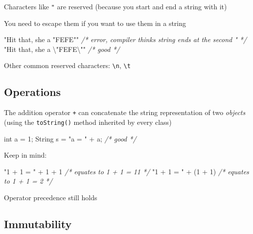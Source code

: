 \documentclass[]{article}
\newenvironment{Shaded}{}{}
\newcommand{\BuiltInTok}[1]{#1}
\newcommand{\CommentTok}[1]{\textcolor[rgb]{0.38,0.63,0.69}{\textit{#1}}}
\newcommand{\DataTypeTok}[1]{\textcolor[rgb]{0.56,0.13,0.00}{#1}}
\newcommand{\DecValTok}[1]{\textcolor[rgb]{0.25,0.63,0.44}{#1}}
\newcommand{\NormalTok}[1]{#1}
\newcommand{\SpecialCharTok}[1]{\textcolor[rgb]{0.25,0.44,0.63}{#1}}
\newcommand{\StringTok}[1]{\textcolor[rgb]{0.25,0.44,0.63}{#1}}
\begin{document}
Characters like \texttt{"} are reserved (because you start and end a
string with it)

You need to escape them if you want to use them in a string

\begin{Shaded}
\begin{Highlighting}[]
\StringTok{"Hit that, she a "}\NormalTok{FEFE}\StringTok{""} \CommentTok{/* error, compiler thinks string ends at the second " */}
\StringTok{"Hit that, she a }\SpecialCharTok{\textbackslash{}"}\StringTok{FEFE}\SpecialCharTok{\textbackslash{}"}\StringTok{"} \CommentTok{/* good */}
\end{Highlighting}
\end{Shaded}

Other common reserved characters: \texttt{\textbackslash{}n},
\texttt{\textbackslash{}t}

\hypertarget{operations}{%
\subsection{Operations}\label{operations}}

The addition operator \texttt{+} can concatenate the string
representation of two \emph{objects} (using the \texttt{toString()}
method inherited by every class)

\begin{Shaded}
\begin{Highlighting}[]
\DataTypeTok{int}\NormalTok{ a = }\DecValTok{1}\NormalTok{;}
\BuiltInTok{String}\NormalTok{ s = }\StringTok{"a = "}\NormalTok{ + a; }\CommentTok{/* good */}
\end{Highlighting}
\end{Shaded}

Keep in mind:

\begin{Shaded}
\begin{Highlighting}[]
\StringTok{"1 + 1 = "}\NormalTok{ + }\DecValTok{1}\NormalTok{ + }\DecValTok{1} \CommentTok{/* equates to 1 + 1 = 11 */}
\StringTok{"1 + 1 = "}\NormalTok{ + (}\DecValTok{1}\NormalTok{ + }\DecValTok{1}\NormalTok{) }\CommentTok{/* equates to 1 + 1 = 2 */}
\end{Highlighting}
\end{Shaded}

Operator precedence still holds

\hypertarget{immutability}{%
\subsection{Immutability}\label{immutability}}
\end{document}
